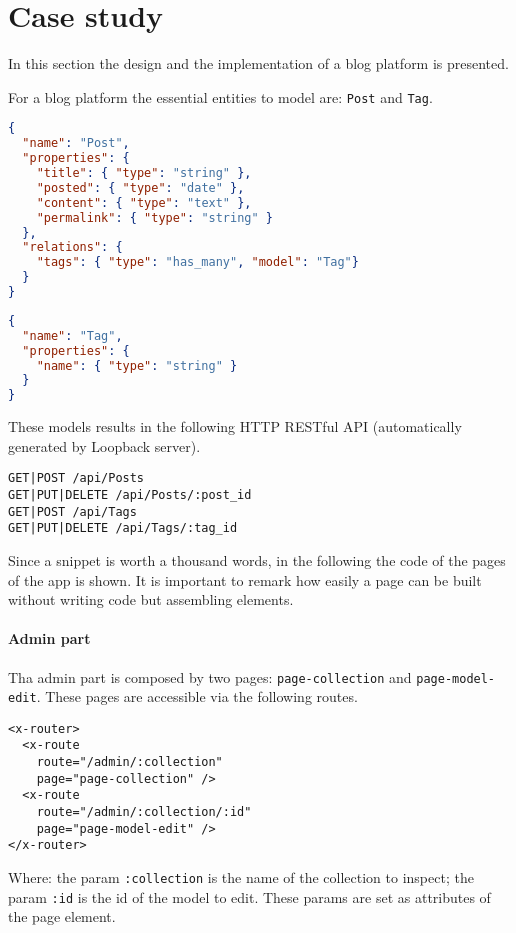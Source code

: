 \section{Case study}\label{sec:case-study}
In this section the design and the implementation of a blog platform is presented. 

For a blog platform the essential entities to model are: \texttt{Post} and \texttt{Tag}.

\begin{lstlisting}[language=json]
{
  "name": "Post",
  "properties": {
    "title": { "type": "string" },
    "posted": { "type": "date" },
    "content": { "type": "text" },
    "permalink": { "type": "string" }
  }, 
  "relations": {
    "tags": { "type": "has_many", "model": "Tag"}
  }
}
\end{lstlisting}

\begin{lstlisting}[language=json]
{
  "name": "Tag",
  "properties": {
    "name": { "type": "string" }
  }
}
\end{lstlisting}

These models results in the following HTTP RESTful API (automatically generated by Loopback server).

\begin{lstlisting}
GET|POST /api/Posts
GET|PUT|DELETE /api/Posts/:post_id
GET|POST /api/Tags
GET|PUT|DELETE /api/Tags/:tag_id
\end{lstlisting}

Since a snippet is worth a thousand words, in the following the code of the pages of the app is shown.
It is important to remark how easily a page can be built without writing code but assembling elements. 

\paragraph{Admin part}

Tha admin part is composed by two pages: \texttt{page-collection} and \texttt{page-model-edit}.
These pages are accessible via the following routes.

\begin{lstlisting}[language=HTML5]
<x-router>
  <x-route 
    route="/admin/:collection" 
    page="page-collection" />
  <x-route 
    route="/admin/:collection/:id"
    page="page-model-edit" />
</x-router>
\end{lstlisting}

Where:
the param \texttt{:collection} is the name of the collection to inspect;
the param \texttt{:id} is the id of the model to edit.
These params are set as attributes of the page element.

